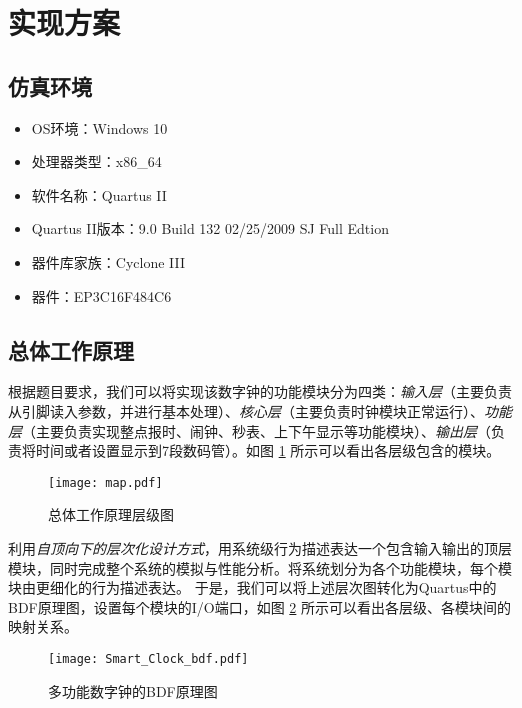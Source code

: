 \documentclass[12pt,AutoFakeBold]{article}
\begin{document}
\section{实现方案}
\subsection{仿真环境}
\begin{itemize}
    \item OS环境：Windows 10
    \item 处理器类型：x86\_64
    \item 软件名称：Quartus II
    \item Quartus II版本：9.0 Build 132 02/25/2009 SJ Full Edtion
    \item 器件库家族：Cyclone III
    \item 器件：EP3C16F484C6
\end{itemize}

\subsection{总体工作原理}
根据题目要求，我们可以将实现该数字钟的功能模块分为四类：\textit{输入层}（主要负责从引脚读入参数，并进行基本处理）、\textit{核心层}（主要负责时钟模块正常运行）、\textit{功能层}（主要负责实现整点报时、闹钟、秒表、上下午显示等功能模块）、\textit{输出层}（负责将时间或者设置显示到7段数码管）。如图 \ref{fig:map} 所示可以看出各层级包含的模块。
\begin{figure}[htbp]
    \centering
    \texttt{[image: map.pdf]} 	%
    \caption{总体工作原理层级图}		%
    \label{fig:map}							%
\end{figure}

利用\textit{自顶向下的层次化设计方式}，用系统级行为描述表达一个包含输入输出的顶层模块，同时完成整个系统的模拟与性能分析。将系统划分为各个功能模块，每个模块由更细化的行为描述表达。
于是，我们可以将上述层次图转化为Quartus中的BDF原理图，设置每个模块的I/O端口，如图 \ref{fig:Smart_Clock_bdf} 所示可以看出各层级、各模块间的映射关系。
\begin{landscape}

\begin{figure}[htbp]
    \centering
    \texttt{[image: Smart\_Clock\_bdf.pdf]} 	%
    \caption{多功能数字钟的BDF原理图}		%
    \label{fig:Smart_Clock_bdf}							%
\end{figure}
\end{landscape}
\end{document}

